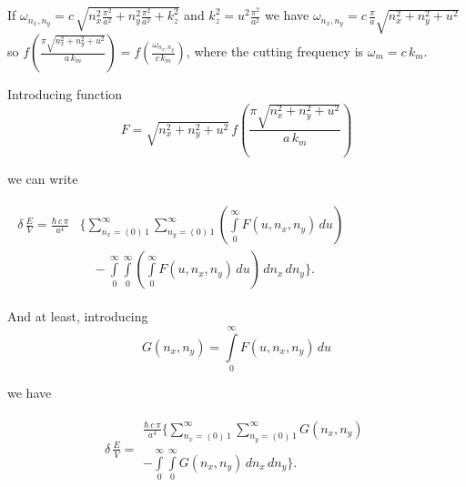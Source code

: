 \documentclass[twoside, 10pt, ptm]{article}
\begin{document}
\begin{multicols}{2}


    If \(\omega _{n_x,n_y} = c\,\sqrt{n_x^2\frac{\pi^2}{a^2}+n_y^2\frac{\pi^2}{a^2}+k_z^2}\)
and \(k_z^2 = u^2 \frac{\pi^2}{a^2}\) we have
\(\omega _{n_x,n_y} = c \, \frac{\pi}{a} \sqrt{n_x^2+n_y^2+u^2}\) so
\(f\left(\frac{\pi\sqrt{n_x^2 + n_y^2+u^2}}{a\,k_m}\right) = f\left(\frac{\omega _{n_x,n_y}}{c\,k_m}\right)\),
where the cutting frequency is \(\omega_m = c\,k_m\).

    Introducing function
\noindent
\begin{equation} \label{eq:4}
F = %
\sqrt{n_x^2 + n_y^2+u^2}\,
f\left(\frac{\pi\sqrt{n_x^2 + n_y^2+u^2}}{a\,k_m}\right)
\end{equation}

    we can write

\noindent
$\begin{array}{c}
\begin{array}{ll}
\delta\,\frac{E}{V} =
\frac{\hbar\,c\,\pi}{a^4}
&\Bigg\{
\sum\limits_{n_x=\left(0\right)\,1}^{\infty}
\sum\limits_{n_y=\left(0\right)\,1}^{\infty}
\left(\int\limits_{0}^{\infty}F\left(u, n_x, n_y\right)\,d{u}\right)
\\
\, & \,\,\,\,\,\, - \int\limits_{0}^{\infty}
\int\limits_{0}^{\infty}
\left(\int\limits_{0}^{\infty}F\left(u, n_x, n_y\right)\,d{u}\right)
\,d{n_x}\,d{n_y}
\Bigg\}.
\end{array}
\end{array}$

    And at least, introducing
\noindent
\begin{equation} \label{eq:5}
G\left(n_x, n_y\right) = \int\limits_{0}^{\infty}F\left(u, n_x, n_y\right)\,d{u}
\end{equation}

    we have

    \begin{equation} \label{eq:6}
\begin{array}{lr}
\delta\,\frac{E}{V} =
\begin{array}{c}
 \frac{\hbar\,c\,\pi}{a^4} \Bigg\{
\sum\limits_{n_x=\left(0\right)\,1}^{\infty}
\sum\limits_{n_y=\left(0\right)\,1}^{\infty}
G\left(n_x, n_y\right)
\\
- \int\limits_{0}^{\infty}
\int\limits_{0}^{\infty}
G\left(n_x, n_y\right)
\,d{n_x}\,d{n_y}
\Bigg\}.
\end{array}
\end{array}
\end{equation}


\end{multicols}
\end{document}
